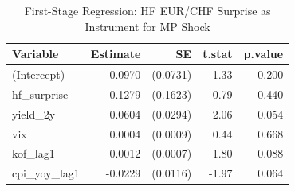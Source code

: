 \begin{table}[ht]
\centering
\caption{First-Stage Regression: HF EUR/CHF Surprise as Instrument for MP Shock} 
\label{tab:hf_first_stage}
\begin{tabular}{lrrrr}
  \toprule
Variable & Estimate & SE & t.stat & p.value \\ 
  \midrule
(Intercept) & -0.0970 & (0.0731) & -1.33 & 0.200 \\ 
  hf\_surprise & 0.1279 & (0.1623) & 0.79 & 0.440 \\ 
  yield\_2y & 0.0604 & (0.0294) & 2.06 & 0.054 \\ 
  vix & 0.0004 & (0.0009) & 0.44 & 0.668 \\ 
  kof\_lag1 & 0.0012 & (0.0007) & 1.80 & 0.088 \\ 
  cpi\_yoy\_lag1 & -0.0229 & (0.0116) & -1.97 & 0.064 \\ 
   \bottomrule
\end{tabular}
\end{table}
